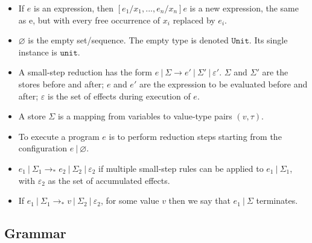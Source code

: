 \documentclass{llncs}
\newcommand{\keywadj}[1]{\mathtt{#1}}
\begin{document}
\begin{itemize}
	\item If $e$ is an expression, then $[e_1/x_1, ..., e_n/x_n]e$ is a new expression, the same as e, but with every free occurrence of $x_i$ replaced by $e_i$.
	\item $\varnothing$ is the empty set/sequence. The empty type is denoted $\keywadj{Unit}$. Its single instance is $\keywadj{unit}$.
	\item A small-step reduction has the form $e~|~\Sigma \longrightarrow e'~|~\Sigma'~|~\varepsilon'$. $\Sigma$ and $\Sigma'$ are the stores before and after; $e$ and $e'$ are the expression to be evaluated before and after; $\varepsilon$ is the set of effects during execution of $e$.
	\item A store $\Sigma$ is a mapping from variables to value-type pairs $(v,\tau)$.
	\item To execute a program $e$ is to perform reduction steps starting from the configuration $e~|~\varnothing$.
	\item $e_1~|~\Sigma_1 \longrightarrow_* e_2~|~\Sigma_2~|~\varepsilon_2$ if multiple small-step rules can be applied to $e_1~|~\Sigma_1$, with $\varepsilon_2$ as the set of accumulated effects. 
	\item If $e_1~|~\Sigma_1 \longrightarrow_* v~|~\Sigma_2~|~\varepsilon_2$, for some value $v$ then we say that $e_1~|~\Sigma$ terminates.
\end{itemize}

\subsection{Grammar}
\end{document}
